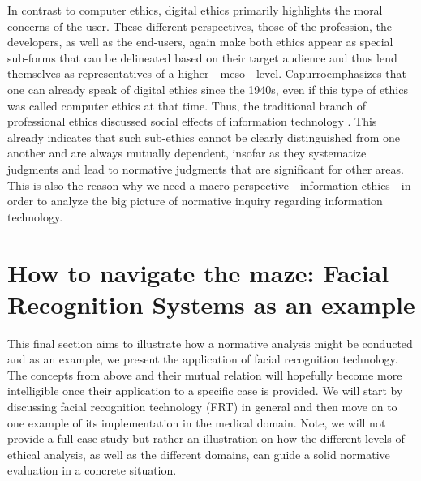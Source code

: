 \documentclass[manuscript,screen]{acmart}
\begin{document}
In contrast to computer ethics, digital ethics primarily highlights the moral concerns of the user. These different perspectives, those of the profession, the developers, as well as the end-users, again make both ethics appear as special sub-forms that can be delineated based on their target audience and thus lend themselves as representatives of a higher - meso - level. Capurroemphasizes that one can already speak of digital ethics since the 1940s, even if this type of ethics was called computer ethics at that time. Thus, the traditional branch of professional ethics discussed social effects of information technology \citep{capurro2017digitization}. This already indicates that such sub-ethics cannot be clearly distinguished from one another and are always mutually dependent, insofar as they systematize judgments and lead to normative judgments that are significant for other areas. This is also the reason why we need a macro perspective - information ethics - in order to analyze the big picture of normative inquiry regarding information technology. 

\section{How to navigate the maze: Facial Recognition Systems as an example}
This final section aims to illustrate how a normative analysis might be conducted and as an example, we present the application of facial recognition technology. The concepts from above and their mutual relation will hopefully become more intelligible once their application to a specific case is provided. We will start by discussing facial recognition technology (FRT) in general and then move on to one example of its implementation in the medical domain. Note, we will not provide a full case study but rather an illustration on how the different levels of ethical analysis, as well as the different domains, can guide a solid normative evaluation in a concrete situation.
\end{document}
